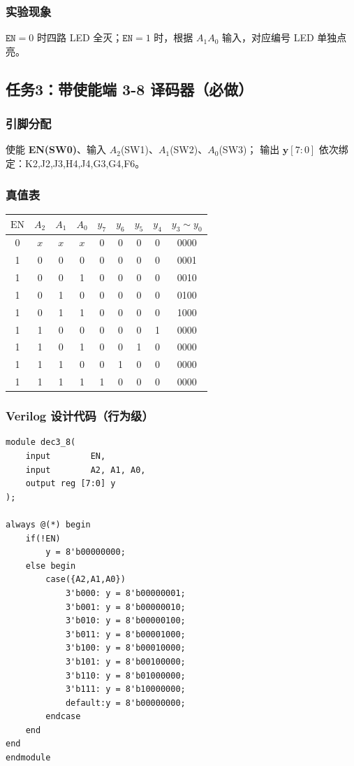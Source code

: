 \documentclass[11pt,a4paper]{article}
\begin{document}
\subsubsection{实验现象}
$\texttt{EN}=0$ 时四路 LED 全灭；$\texttt{EN}=1$ 时，根据 $A_1A_0$ 输入，对应编号 LED 单独点亮。

\newpage
\subsection{任务3：带使能端 3-8 译码器（必做）}
\subsubsection{引脚分配}
使能 \textbf{EN(SW0)}、输入 $A_2$(SW1)、$A_1$(SW2)、$A_0$(SW3)；
输出 $\boldsymbol{y}[7:0]$ 依次绑定：K2,J2,J3,H4,J4,G3,G4,F6。

\subsubsection{真值表}
\begin{table}[htbp]
\centering
\begin{tabular}{ccccccccc}
\toprule
$\text{EN}$ & $A_2$ & $A_1$ & $A_0$ & $y_7$ & $y_6$ & $y_5$ & $y_4$ & $y_3\sim y_0$ \\
\midrule
0  & $x$  & $x$  & $x$  & 0  & 0  & 0  & 0  & 0000 \\
1  & 0  & 0  & 0  & 0  & 0  & 0  & 0  & 0001 \\
1  & 0  & 0  & 1  & 0  & 0  & 0  & 0  & 0010 \\
1  & 0  & 1  & 0  & 0  & 0  & 0  & 0  & 0100 \\
1  & 0  & 1  & 1  & 0  & 0  & 0  & 0  & 1000 \\
1  & 1  & 0  & 0  & 0  & 0  & 0  & 1  & 0000 \\
1  & 1  & 0  & 1  & 0  & 0  & 1  & 0  & 0000 \\
1  & 1  & 1  & 0  & 0  & 1  & 0  & 0  & 0000 \\
1  & 1  & 1  & 1  & 1  & 0  & 0  & 0  & 0000 \\
\bottomrule
\end{tabular}
\end{table}

\subsubsection{Verilog 设计代码（行为级）}
\begin{lstlisting}
module dec3_8(
    input        EN,
    input        A2, A1, A0,
    output reg [7:0] y
);

always @(*) begin
    if(!EN)
        y = 8'b00000000;
    else begin
        case({A2,A1,A0})
            3'b000: y = 8'b00000001;
            3'b001: y = 8'b00000010;
            3'b010: y = 8'b00000100;
            3'b011: y = 8'b00001000;
            3'b100: y = 8'b00010000;
            3'b101: y = 8'b00100000;
            3'b110: y = 8'b01000000;
            3'b111: y = 8'b10000000;
            default:y = 8'b00000000;
        endcase
    end
end
endmodule
\end{lstlisting}
\end{document}
